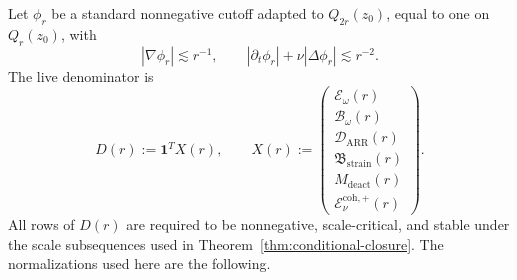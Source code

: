 \documentclass[11pt]{article}
\begin{document}
Let \(\phi_r\) be a standard nonnegative cutoff adapted to \(Q_{2r}(z_0)\),
equal to one on \(Q_r(z_0)\), with
\[
|\nabla\phi_r|\lesssim r^{-1},\qquad
|\partial_t\phi_r|+\nu|\Delta\phi_r|\lesssim r^{-2}.
\]
The live denominator is
\begin{equation}
\label{eq:D-def}
D(r):=\mathbf 1^T X(r),
\qquad
X(r):=
\begin{pmatrix}
\mathcal E_\omega(r)\\
\mathcal B_\omega(r)\\
\mathcal D_{\mathrm{ARR}}(r)\\
\mathfrak B_{\mathrm{strain}}(r)\\
M_{\mathrm{deact}}(r)\\
\mathcal E_\nu^{\mathrm{coh},+}(r)
\end{pmatrix}.
\end{equation}
All rows of \(D(r)\) are required to be nonnegative, scale-critical, and stable
under the scale subsequences used in Theorem~\ref{thm:conditional-closure}.  The
normalizations used here are the following.
\end{document}
